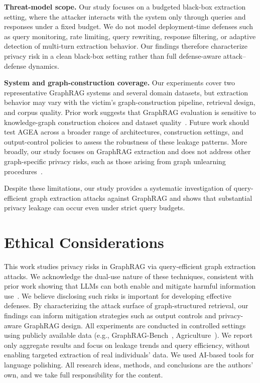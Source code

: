 \noindent\textbf{Threat-model scope.}
Our study focuses on a budgeted black-box extraction setting, where the attacker interacts with the system only through queries and responses under a fixed budget. We do not model deployment-time defenses such as query monitoring, rate limiting, query rewriting, response filtering, or adaptive detection of multi-turn extraction behavior. Our findings therefore characterize privacy risk in a clean black-box setting rather than full defense-aware attack--defense dynamics.

\noindent\textbf{System and graph-construction coverage.}
Our experiments cover two representative GraphRAG systems and several domain datasets, but extraction behavior may vary with the victim’s graph-construction pipeline, retrieval design, and corpus quality. Prior work suggests that GraphRAG evaluation is sensitive to knowledge-graph construction choices and dataset quality~\cite{zhang2025diagnosing}. Future work should test AGEA across a broader range of architectures, construction settings, and output-control policies to assess the robustness of these leakage patterns. More broadly, our study focuses on GraphRAG extraction and does not address other graph-specific privacy risks, such as those arising from graph unlearning procedures~\cite{zhang2024graph,zhang2026attack,zhang2026unlearning}.

\noindent Despite these limitations, our study provides a systematic investigation of query-efficient graph extraction attacks against GraphRAG and shows that substantial privacy leakage can occur even under strict query budgets.
\section*{Ethical Considerations}

This work studies privacy risks in GraphRAG via query-efficient graph extraction attacks. We acknowledge the dual-use nature of these techniques, consistent with prior work showing that LLMs can both enable and mitigate harmful information use~\cite{lucas2023fighting}. 
We believe disclosing such risks is important for developing effective defenses. By characterizing the attack surface of graph-structured retrieval, our findings can inform mitigation strategies such as output controls and privacy-aware GraphRAG design.
All experiments are conducted in controlled settings using publicly available data (e.g., GraphRAG-Bench~\cite{xiao2025graphrag}, Agriculture~\cite{zhou2025depth}). We report only aggregate results and focus on leakage trends and query efficiency, without enabling targeted extraction of real individuals’ data.
We used AI-based tools for language polishing. All research ideas, methods, and conclusions are the authors’ own, and we take full responsibility for the content.

